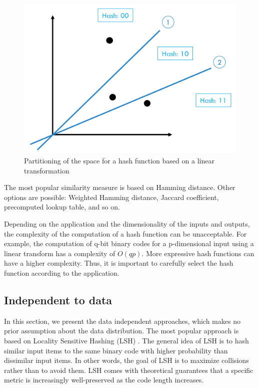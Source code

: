 \begin{figure}
	\includegraphics[width=\linewidth]{lsh.png}
	\caption{Partitioning of the space for a hash function based on a linear transformation}
	\label{fig:lsh}
\end{figure}

The most popular similarity measure is based on Hamming distance. Other options are possible: Weighted Hamming distance, Jaccard coefficient, precomputed lookup table, and so on.

Depending on the application and the dimensionality of the inputs and outputs, the complexity of the computation of a hash function can be unacceptable. For example, the computation of q-bit binary codes for a p-dimensional input using a linear transform has a complexity of $O(qp)$. More expressive hash functions can have a higher complexity. Thus, it is important to carefully select the hash function according to the application.

\subsection{Independent to data}
In this section, we present the data independent approaches, which makes no prior assumption about the data distribution. The most popular approach is based on Locality Sensitive Hashing (LSH) \cite{DBLP:journals/corr/WangSSJ14}. The general idea of LSH is to hash similar input items to the same binary code with higher probability than dissimilar input items. In other words, the goal of LSH is to maximize collisions rather than to avoid them. LSH comes with theoretical guarantees that a specific metric is increasingly well-preserved as the code length increases.

